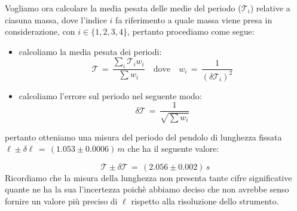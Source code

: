Vogliamo ora calcolare la media pesata delle medie del periodo ($\mathcal{T}_i$) relative a ciasuna massa, dove l'indice $i$ fa riferimento a quale massa viene presa in considerazione, con $i \in \{1,2,3,4\}$, pertanto procediamo come segue:
\begin{itemize}
	\item{calcoliamo la media pesata dei periodi:
			\begin{equation*}
				\mathcal{T} \,=\, \frac{\sum_i \mathcal{T}_i w_i}{\sum w_i} \quad \text{dove} \quad w_i \,=\, \frac{1}{(\delta \mathcal{T}_i)^2}
			\end{equation*}
			}
	\item{calcoliamo l'errore sul periodo nel seguente modo:
			\begin{equation*}
				\delta \mathcal{T} \,=\, \frac{1}{\sqrt{\sum w_i}}
			\end{equation*}
			}
\end{itemize}
pertanto otteniamo una misura del periodo del pendolo di lunghezza fissata $\ell \pm \delta \ell \,=\, (1.053 \pm 0.0006) \, m$ che ha il seguente valore:

\begin{equation*}
	\mathcal{T} \pm \delta \mathcal{T} \,=\, (2.056 \pm 0.002) \, s
\end{equation*}
%
Ricordiamo che la misura della lunghezza non presenta tante cifre significative quante ne ha la sua l'incertezza poichè abbiamo deciso che non avrebbe senso fornire un valore più preciso di $\ell$ rispetto alla risoluzione dello strumento.